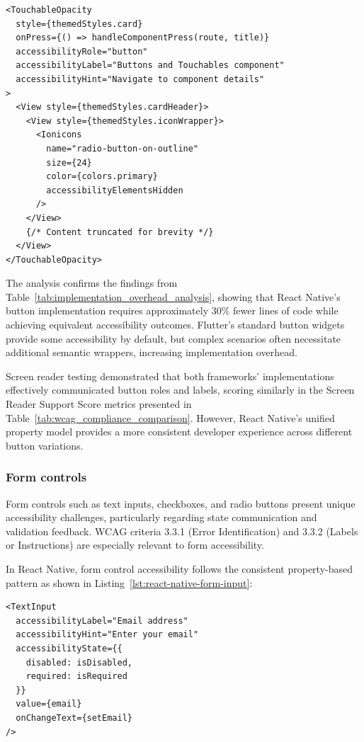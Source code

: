 \begin{lstlisting}[style=ReactNativeStyle, caption=\textit{AccessibleHub}'s React Native implementation of accessible buttons, label=lst:accessiblehub-button]
<TouchableOpacity
  style={themedStyles.card}
  onPress={() => handleComponentPress(route, title)}
  accessibilityRole="button"
  accessibilityLabel="Buttons and Touchables component"
  accessibilityHint="Navigate to component details"
>
  <View style={themedStyles.cardHeader}>
    <View style={themedStyles.iconWrapper}>
      <Ionicons
        name="radio-button-on-outline"
        size={24}
        color={colors.primary}
        accessibilityElementsHidden
      />
    </View>
    {/* Content truncated for brevity */}
  </View>
</TouchableOpacity>
\end{lstlisting}

\pagebreak

The analysis confirms the findings from Table~\ref{tab:implementation_overhead_analysis}, showing that React Native's button implementation requires approximately 30\% fewer lines of code while achieving equivalent accessibility outcomes. Flutter's standard button widgets provide some accessibility by default, but complex scenarios often necessitate additional semantic wrappers, increasing implementation overhead.

Screen reader testing demonstrated that both frameworks' implementations effectively communicated button roles and labels, scoring similarly in the Screen Reader Support Score metrics presented in Table~\ref{tab:wcag_compliance_comparison}. However, React Native's unified property model provides a more consistent developer experience across different button variations.

\subsubsection{Form controls}
\label{subsubsec:form-controls}

Form controls such as text inputs, checkboxes, and radio buttons present unique accessibility challenges, particularly regarding state communication and validation feedback. WCAG criteria 3.3.1 (Error Identification) and 3.3.2 (Labels or Instructions) are especially relevant to form accessibility.

In React Native, form control accessibility follows the consistent property-based pattern as shown in Listing~\ref{lst:react-native-form-input}:

\begin{lstlisting}[style=ReactNativeStyle, caption=Accessible form input in React Native, label=lst:react-native-form-input]
<TextInput
  accessibilityLabel="Email address"
  accessibilityHint="Enter your email"
  accessibilityState={{ 
    disabled: isDisabled,
    required: isRequired 
  }}
  value={email}
  onChangeText={setEmail}
/>
\end{lstlisting}

